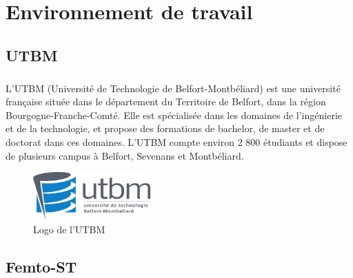 \chapter{Environnement de travail}
\section{UTBM}
\paragraph{} \hspace{10mm}
L'UTBM (Université de Technologie de Belfort-Montbéliard) est une université française située dans le département du Territoire de Belfort, dans la région Bourgogne-Franche-Comté. Elle est spécialisée dans les domaines de l'ingénierie et de la technologie, et propose des formations de bachelor, de master et de doctorat dans ces domaines. L'UTBM compte environ 2 800 étudiants et dispose de plusieurs campus à Belfort, Sevenans et Montbéliard.

\begin{figure} [H]
    \centering
    \includegraphics[width=0.4\textwidth]{assets/logo/utbm_logo.png}
    \caption{Logo de l'UTBM}
    \label{fig:logoUTBM}
\end{figure}

\section{Femto-ST}
